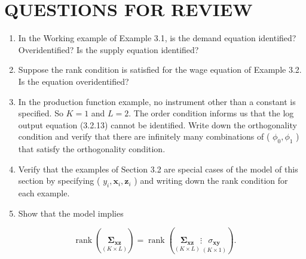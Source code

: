 \documentclass[10pt]{article}
\begin{document}
\section*{QUESTIONS FOR REVIEW}
\begin{enumerate}
  \item In the Working example of Example 3.1, is the demand equation identified? Overidentified? Is the supply equation identified?
  \item Suppose the rank condition is satisfied for the wage equation of Example 3.2. Is the equation overidentified?
  \item In the production function example, no instrument other than a constant is specified. So $K=1$ and $L=2$. The order condition informs us that the log output equation (3.2.13) cannot be identified. Write down the orthogonality condition and verify that there are infinitely many combinations of ( $\phi_{0}, \phi_{1}$ ) that satisfy the orthogonality condition.
  \item Verify that the examples of Section 3.2 are special cases of the model of this section by specifying ( $y_{i}, \mathbf{x}_{i}, \mathbf{z}_{i}$ ) and writing down the rank condition for each example.
  \item Show that the model implies
\end{enumerate}

$$
\operatorname{rank}\left(\underset{(K \times L)}{\boldsymbol{\Sigma}_{\mathbf{x z}}}\right)=\operatorname{rank}\left(\underset{(K \times L)}{\boldsymbol{\Sigma}_{\mathbf{x z}}} \vdots \underset{(K \times 1)}{\sigma_{\mathbf{x y}}}\right) .
$$
\end{document}
